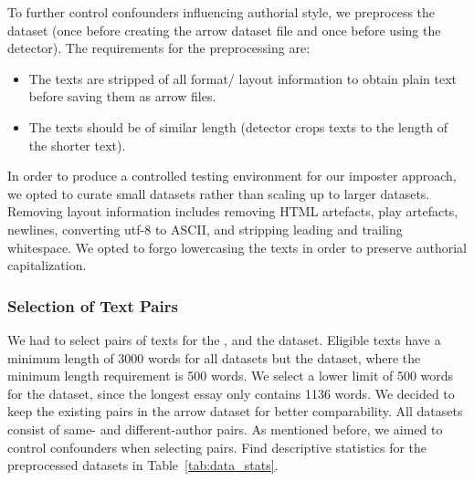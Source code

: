 To further control confounders influencing authorial style, we preprocess the dataset 
(once before creating the arrow dataset file and once before using the detector).
The requirements for the preprocessing are:
\begin{itemize}
    \item The texts are stripped of all format/ layout information to obtain plain text before saving them as arrow files.
    \item The texts should be of similar length (detector crops texts to the length of the shorter text).
\end{itemize}
In order to produce a controlled testing environment for our imposter approach, 
we opted to curate small datasets rather than scaling up to larger datasets.
Removing layout information includes removing HTML artefacts, play artefacts, newlines, 
converting utf-8 to ASCII, and stripping leading and trailing whitespace.
We opted to forgo lowercasing the texts in order to preserve authorial capitalization.


\subsubsection{Selection of Text Pairs}
\label{subsubsec:dataset_text_pair_selection}

We had to select pairs of texts for the \dataBlog{}, \dataStudent{} and the \dataGutenberg{} dataset.
Eligible texts have a minimum length of \num{3000} words for all datasets but the \dataStudent{} dataset, 
where the minimum length requirement is \num{500} words.
We select a lower limit of \num{500} words for the \dataStudent{} dataset, 
since the longest essay only contains \num{1136} words.
We decided to keep the existing pairs in the \dataPan{} arrow dataset for better comparability.
All datasets consist of same- and different-author pairs. 
As mentioned before, we aimed to control confounders when selecting pairs.
Find descriptive statistics for the preprocessed datasets in Table~\ref{tab:data_stats}.

